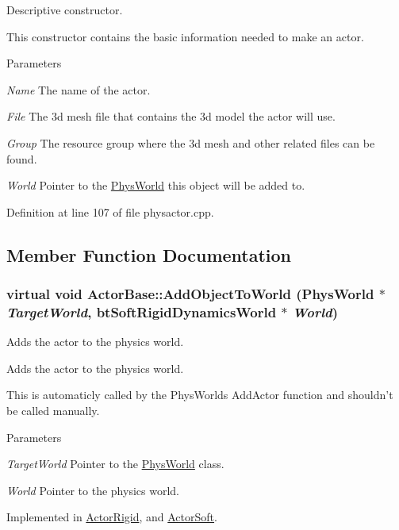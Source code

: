 Descriptive constructor. 

This constructor contains the basic information needed to make an actor. 
\begin{DoxyParams}{Parameters}
\item[{\em Name}]The name of the actor. \item[{\em File}]The 3d mesh file that contains the 3d model the actor will use. \item[{\em Group}]The resource group where the 3d mesh and other related files can be found. \item[{\em World}]Pointer to the \hyperlink{classPhysWorld}{PhysWorld} this object will be added to. \end{DoxyParams}


Definition at line 107 of file physactor.cpp.



\subsection{Member Function Documentation}
\hypertarget{classActorBase_a1af82a2ed960fd114518fdf84d5ff146}{
\subsubsection[{AddObjectToWorld}]{\setlength{\rightskip}{0pt plus 5cm}virtual void ActorBase::AddObjectToWorld ({\bf PhysWorld} $\ast$ {\em TargetWorld}, \/  btSoftRigidDynamicsWorld $\ast$ {\em World})}}
\label{dd/d7b/classActorBase_a1af82a2ed960fd114518fdf84d5ff146}


Adds the actor to the physics world. 

Adds the actor to the physics world. \par
 This is automaticly called by the PhysWorlds AddActor function and shouldn't be called manually. 
\begin{DoxyParams}{Parameters}
\item[{\em TargetWorld}]Pointer to the \hyperlink{classPhysWorld}{PhysWorld} class. \item[{\em World}]Pointer to the physics world. \end{DoxyParams}


Implemented in \hyperlink{classActorRigid_ac6d7e05944623329f0c2140c19e2c49e}{ActorRigid}, and \hyperlink{classActorSoft_a0def29f28ed4d126a0634ddc97e33e2f}{ActorSoft}.

